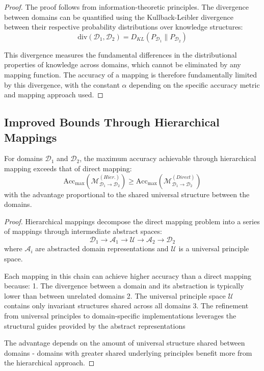 \begin{proof}
The proof follows from information-theoretic principles. The divergence between domains can be quantified using the Kullback-Leibler divergence between their respective probability distributions over knowledge structures:
\begin{equation}
\text{div}(\mathcal{D}_1, \mathcal{D}_2) = D_{KL}(P_{\mathcal{D}_1} \| P_{\mathcal{D}_2})
\end{equation}

This divergence measures the fundamental differences in the distributional properties of knowledge across domains, which cannot be eliminated by any mapping function. The accuracy of a mapping is therefore fundamentally limited by this divergence, with the constant $\alpha$ depending on the specific accuracy metric and mapping approach used.
\end{proof}

\subsection{Improved Bounds Through Hierarchical Mappings}

\begin{theorem}
For domains $\mathcal{D}_1$ and $\mathcal{D}_2$, the maximum accuracy achievable through hierarchical mapping exceeds that of direct mapping:
\begin{equation}
\text{Acc}_{\max}(\mathcal{M}^{(Hier.)}_{\mathcal{D}_1 \rightarrow \mathcal{D}_2}) \geq \text{Acc}_{\max}(\mathcal{M}^{(Direct)}_{\mathcal{D}_1 \rightarrow \mathcal{D}_2})
\end{equation}
with the advantage proportional to the shared universal structure between the domains.
\end{theorem}

\begin{proof}
Hierarchical mappings decompose the direct mapping problem into a series of mappings through intermediate abstract spaces:
\begin{equation}
\mathcal{D}_1 \rightarrow \mathcal{A}_1 \rightarrow \mathcal{U} \rightarrow \mathcal{A}_2 \rightarrow \mathcal{D}_2
\end{equation}
where $\mathcal{A}_i$ are abstracted domain representations and $\mathcal{U}$ is a universal principle space.

Each mapping in this chain can achieve higher accuracy than a direct mapping because:
1. The divergence between a domain and its abstraction is typically lower than between unrelated domains
2. The universal principle space $\mathcal{U}$ contains only invariant structures shared across all domains
3. The refinement from universal principles to domain-specific implementations leverages the structural guides provided by the abstract representations

The advantage depends on the amount of universal structure shared between domains - domains with greater shared underlying principles benefit more from the hierarchical approach.
\end{proof}

